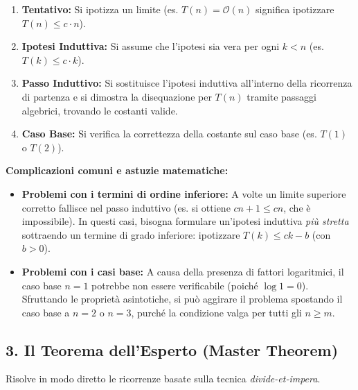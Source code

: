 \documentclass[12pt, a4paper]{article}
\begin{document}
\begin{tcolorbox}[colback=lightergray!10, colframe=tocsec, title=\textbf{Procedura del Metodo della Sostituzione}]
\begin{enumerate}
\item \textbf{Tentativo:} Si ipotizza un limite (es. $T(n) = \mathcal{O}(n)$ significa ipotizzare $T(n) \le c \cdot n$).
\item \textbf{Ipotesi Induttiva:} Si assume che l'ipotesi sia vera per ogni $k < n$ (es. $T(k) \le c \cdot k$).
\item \textbf{Passo Induttivo:} Si sostituisce l'ipotesi induttiva all'interno della ricorrenza di partenza e si dimostra la disequazione per $T(n)$ tramite passaggi algebrici, trovando le costanti valide.
\item \textbf{Caso Base:} Si verifica la correttezza della costante sul caso base (es. $T(1)$ o $T(2)$).
\end{enumerate}
\end{tcolorbox}

\textbf{Complicazioni comuni e astuzie matematiche:}
\begin{itemize}
\item \textbf{Problemi con i termini di ordine inferiore:} A volte un limite superiore corretto fallisce nel passo induttivo (es. si ottiene $cn + 1 \le cn$, che è impossibile). In questi casi, bisogna formulare un'ipotesi induttiva \textit{più stretta} sottraendo un termine di grado inferiore: ipotizzare $T(k) \le ck - b$ (con $b>0$).
\item \textbf{Problemi con i casi base:} A causa della presenza di fattori logaritmici, il caso base $n=1$ potrebbe non essere verificabile (poiché $\log 1 = 0$). Sfruttando le proprietà asintotiche, si può aggirare il problema spostando il caso base a $n=2$ o $n=3$, purché la condizione valga per tutti gli $n \ge m$.
\end{itemize}

\subsection{3. Il Teorema dell'Esperto (Master Theorem)}
Risolve in modo diretto le ricorrenze basate sulla tecnica \textit{divide-et-impera}.
\end{document}
